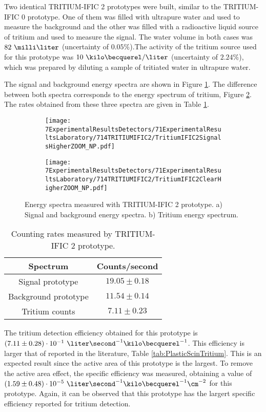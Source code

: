 Two identical TRITIUM-IFIC 2 prototypes were built, similar to the TRITIUM-IFIC 0 prototype. One of them was filled with ultrapure water and used to measure the background and the other was filled with a radioactive liquid source of tritium and used to measure the signal. The water volume in both cases was $82~\milli\liter$ (uncertainty of $0.05\%$).The activity of the tritium source used for this prototype was $10~\kilo\becquerel/\liter$ (uncertainty of $2.24\%$), which was prepared by diluting a sample of tritiated water in ultrapure water.

The signal and background energy spectra are shown in Figure \ref{subfig:SignalBackgroundEnergySpectraTritiumIFIC2}. The difference between both spectra corresponds to the energy spectrum of tritium, Figure \ref{subfig:TritiumEnergySpectraTritiumIFIC2}. The rates obtained from these three spectra are given in Table \ref{tab:CountsPerSecondTRITIUMIFIC2}. 

\begin{figure}
\centering
    \begin{subfigure}[b]{0.73\textwidth}
    \centering
    \texttt{[image: 7ExperimentalResultsDetectors/71ExperimentalResultsLaboratory/714TRITIUMIFIC2/TritiumIFIC2SignalsHigherZOOM\_NP.pdf]}  
    \caption{\label{subfig:SignalBackgroundEnergySpectraTritiumIFIC2}}
    \end{subfigure}
    \hfill
    \begin{subfigure}[b]{0.73\textwidth}
    \centering
    \texttt{[image: 7ExperimentalResultsDetectors/71ExperimentalResultsLaboratory/714TRITIUMIFIC2/TritiumIFIC2ClearHigherZOOM\_NP.pdf]}  
    \caption{\label{subfig:TritiumEnergySpectraTritiumIFIC2}}
    \end{subfigure}
 \caption{Energy spectra measured with TRITIUM-IFIC 2 prototype. a) Signal and background energy spectra. b) Tritium energy spectrum.}
 \label{fig:EnergySpectraTRITIUMIFIC2}
\end{figure}

\begin{table}[htbp]
\centering{}%
\begin{tabular}{cc}
\toprule 
Spectrum & Counts/second \tabularnewline
\midrule
\midrule 
Signal prototype & $19.05 \pm 0.18$ \tabularnewline
Background prototype & $11.54 \pm 0.14$ \tabularnewline  
Tritium counts & $7.11 \pm 0.23$ \tabularnewline
\bottomrule
\end{tabular}
\caption{Counting rates measured by TRITIUM-IFIC 2 prototype.}
\label{tab:CountsPerSecondTRITIUMIFIC2}
\end{table}
The tritium detection efficiency obtained for this prototype is $(7.11 \pm 0.28)\cdot{} 10^{-1}~\liter\second^{-1}\kilo\becquerel^{-1}$. This efficiency is larger that of reported in the literature, Table \ref{tab:PlasticScinTritium}. This is an expected result since the active area of this prototype is the largest. To remove the active area effect, the specific efficiency was measured, obtaining a value of $(1.59 \pm 0.48)\cdot{} 10^{-5}~\liter\second^{-1}\kilo\becquerel^{-1}\cm^{-2}$ for this prototype. Again, it can be observed that this prototype has the largert specific efficiency reported for tritium detection.

